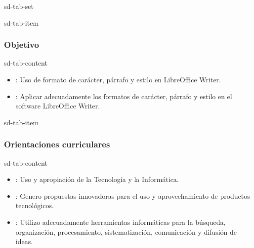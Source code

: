 \documentclass[letterpaper,10pt,spanish]{sphinxmanual}
\begin{document}
\begin{sphinxuseclass}{sd-tab-set}
\begin{sphinxuseclass}{sd-tab-item}\subsubsection*{Objetivo}

\begin{sphinxuseclass}{sd-tab-content}
\sphinxAtStartPar
{}
\begin{itemize}
\item {} 
\sphinxAtStartPar
{}: Uso de formato de carácter, párrafo y estilo en LibreOffice Writer.

\item {} 
\sphinxAtStartPar
{}: Aplicar adecuadamente los formatos de carácter, párrafo y estilo en el software LibreOffice Writer.

\end{itemize}

\end{sphinxuseclass}
\end{sphinxuseclass}
\begin{sphinxuseclass}{sd-tab-item}\subsubsection*{Orientaciones curriculares}

\begin{sphinxuseclass}{sd-tab-content}\begin{itemize}
\item {} 
\sphinxAtStartPar
{}: Uso y apropiación de la Tecnología y la Informática.

\item {} 
\sphinxAtStartPar
{}: Genero propuestas innovadoras para el uso y aprovechamiento de productos tecnológicos.

\item {} 
\sphinxAtStartPar
{}: Utilizo adecuadamente herramientas informáticas para la búsqueda, organización, procesamiento, sistematización, comunicación y difusión de ideas.


\end{itemize}
\end{sphinxuseclass}
\end{sphinxuseclass}
\end{sphinxuseclass}
\end{document}
